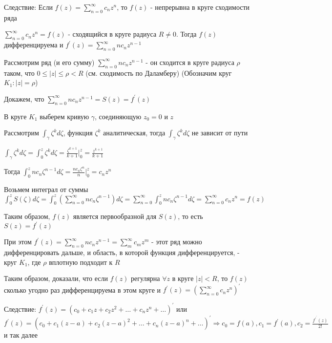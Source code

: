 Следствие: Если $f(z) = \sum_{n = 0}^\infty c_n z^n$, то $f(z)$ - непрерывна в круге сходимости ряда

\begin{MyTheorem}

    $\sum_{n = 0}^\infty c_n z^n = f(z)$ - сходящийся в круге радиуса $R \neq 0$. Тогда $f(z)$ дифференцируема и 
    $f^\prime(z) = \sum_{n = 0}^\infty n c_n z^{n - 1}$
\end{MyTheorem}

\begin{MyProof}
    Рассмотрим ряд (и его сумму) $\sum_{n = 0}^\infty n c_n z^{n - 1}$ - он сходится в круге радиуса $\rho$ таком, что $0 \leq |z| \leq \rho < R$
    (см. сходимость по Даламберу) (Обозначим круг $K_1 : |z| = \rho$)

    Докажем, что $\sum_{n = 0}^\infty n c_n z^{n - 1} = S(z) = f^\prime(z)$

    В круге $K_1$ выберем кривую $\gamma$, соединяющую $z_0 = 0$ и $z$

    Рассмотрим $\int_\gamma \zeta^k d \zeta$, функция $\zeta^k$ аналитическая, тогда $\int_\gamma \zeta^k d\zeta$ не зависит от пути 

    $\int_\gamma \zeta^k d\zeta = \int_0^z \zeta^k d\zeta = \frac{\zeta^{k + 1}}{k + 1} \Big|^z_0 = \frac{z^{k + 1}}{k + 1}$

    Тогда $\int_0^z n c_n \zeta^{n - 1} d\zeta = \frac{n c_n \zeta^n}{n} \Big|_0^z = c_n z^n$

    Возьмем интеграл от суммы $\int_0^z S(\zeta) d\zeta = \int_0^z \left(\sum_{n = 0}^\infty n c_n \zeta^{n - 1}\right) d\zeta = 
    \sum_{n = 0}^\infty \int_0^z n c_n \zeta^{n - 1} d\zeta = \sum_{n = 0}^\infty c_n z^n = f(z)$

    Таким образом, $f(z)$ является первообразной для $S(z)$, то есть $S(z) = f^\prime(z)$

    При этом $f^\prime (z) = \sum_{n = 0}^\infty n c_n z^{n - 1} = \sum_{m}^\infty c_m z^m$ - этот ряд
    можно дифференцировать дальше, и область, в которой функция дифференцируется, - круг $K_1$, где $\rho$ вплотную подходит к $R$

    Таким образом, доказали, что если $f(z)$ регулярна $\forall z$ в круге $|z| < R$, то $f(z)$ сколько угодно раз дифференцируема в этом круге и $f^\prime(z) = \left(\sum_{n = 0}^\infty c_n z^n\right)^\prime$
\end{MyProof}

Следствие: $f^\prime(z) = (c_0 + c_1 z + c_2 z^2 + \dots + c_n z^n + \dots)^\prime$ или 
$f^\prime(z) = (c_0 + c_1 (z - a) + c_2 (z - a)^2 + \dots + c_n (z - a)^n + \dots)^\prime \Longrightarrow c_0 = f(a), c_1 = f^\prime(a), c_2 = \frac{f^\prime^\prime(z)}{2!}$ и так далее 

